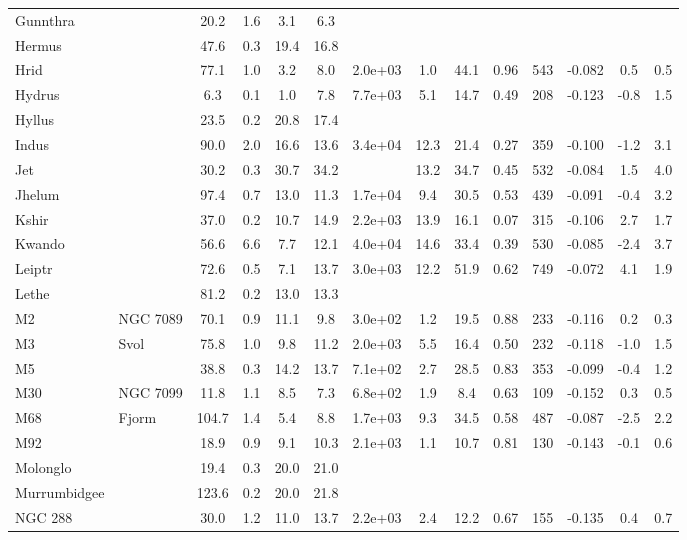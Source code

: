 \begin{tabular}{llSSSSSSSSrSSS}
Gunnthra &  & 20.2 & 1.6 & 3.1 & 6.3 &  &  &  &  &  &  &  &  \\
Hermus &  & 47.6 & 0.3 & 19.4 & 16.8 &  &  &  &  &  &  &  &  \\
Hrid &  & 77.1 & 1.0 & 3.2 & 8.0 & 2.0e+03 & 1.0 & 44.1 & 0.96 & 543 & -0.082 & 0.5 & 0.5 \\
Hydrus &  & 6.3 & 0.1 & 1.0 & 7.8 & 7.7e+03 & 5.1 & 14.7 & 0.49 & 208 & -0.123 & -0.8 & 1.5 \\
Hyllus &  & 23.5 & 0.2 & 20.8 & 17.4 &  &  &  &  &  &  &  &  \\
Indus &  & 90.0 & 2.0 & 16.6 & 13.6 & 3.4e+04 & 12.3 & 21.4 & 0.27 & 359 & -0.100 & -1.2 & 3.1 \\
Jet &  & 30.2 & 0.3 & 30.7 & 34.2 &  & 13.2 & 34.7 & 0.45 & 532 & -0.084 & 1.5 & 4.0 \\
Jhelum &  & 97.4 & 0.7 & 13.0 & 11.3 & 1.7e+04 & 9.4 & 30.5 & 0.53 & 439 & -0.091 & -0.4 & 3.2 \\
Kshir &  & 37.0 & 0.2 & 10.7 & 14.9 & 2.2e+03 & 13.9 & 16.1 & 0.07 & 315 & -0.106 & 2.7 & 1.7 \\
Kwando &  & 56.6 & 6.6 & 7.7 & 12.1 & 4.0e+04 & 14.6 & 33.4 & 0.39 & 530 & -0.085 & -2.4 & 3.7 \\
Leiptr &  & 72.6 & 0.5 & 7.1 & 13.7 & 3.0e+03 & 12.2 & 51.9 & 0.62 & 749 & -0.072 & 4.1 & 1.9 \\
Lethe &  & 81.2 & 0.2 & 13.0 & 13.3 &  &  &  &  &  &  &  &  \\
M2 & NGC 7089 & 70.1 & 0.9 & 11.1 & 9.8 & 3.0e+02 & 1.2 & 19.5 & 0.88 & 233 & -0.116 & 0.2 & 0.3 \\
M3 & Svol & 75.8 & 1.0 & 9.8 & 11.2 & 2.0e+03 & 5.5 & 16.4 & 0.50 & 232 & -0.118 & -1.0 & 1.5 \\
M5 &  & 38.8 & 0.3 & 14.2 & 13.7 & 7.1e+02 & 2.7 & 28.5 & 0.83 & 353 & -0.099 & -0.4 & 1.2 \\
M30 & NGC 7099 & 11.8 & 1.1 & 8.5 & 7.3 & 6.8e+02 & 1.9 & 8.4 & 0.63 & 109 & -0.152 & 0.3 & 0.5 \\
M68 & Fjorm & 104.7 & 1.4 & 5.4 & 8.8 & 1.7e+03 & 9.3 & 34.5 & 0.58 & 487 & -0.087 & -2.5 & 2.2 \\
M92 &  & 18.9 & 0.9 & 9.1 & 10.3 & 2.1e+03 & 1.1 & 10.7 & 0.81 & 130 & -0.143 & -0.1 & 0.6 \\
Molonglo &  & 19.4 & 0.3 & 20.0 & 21.0 &  &  &  &  &  &  &  &  \\
Murrumbidgee &  & 123.6 & 0.2 & 20.0 & 21.8 &  &  &  &  &  &  &  &  \\
NGC 288 &  & 30.0 & 1.2 & 11.0 & 13.7 & 2.2e+03 & 2.4 & 12.2 & 0.67 & 155 & -0.135 & 0.4 & 0.7 \\

\end{tabular}
